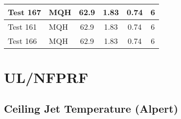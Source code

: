 \begin{table}[!ht]
\begin{center}
\begin{tabular}{|l|l|c|c|c|c|}
Test 167   &  MQH               &  62.9           &  1.83            &  0.74            &  6                    \\ \hline
Test 161   &  MQH               &  62.9           &  1.83            &  0.74            &  6                    \\ \hline
Test 166   &  MQH               &  62.9           &  1.83            &  0.74            &  6                    \\ \hline
\end{tabular}
\end{center}
\end{table}


\clearpage


\section{UL/NFPRF}

\subsection*{Ceiling Jet Temperature (Alpert)~\cite{SFPE:Alpert}}

